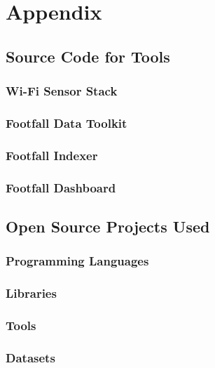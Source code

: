 \chapter{Appendix}

\section{Source Code for Tools}
  \subsection{Wi-Fi Sensor Stack}
  \subsection{Footfall Data Toolkit}
  \subsection{Footfall Indexer}
  \subsection{Footfall Dashboard}
\section{Open Source Projects Used}
  \subsection{Programming Languages}
  \subsection{Libraries}
  \subsection{Tools}
  \subsection{Datasets}

\backmatter


\printindex 

